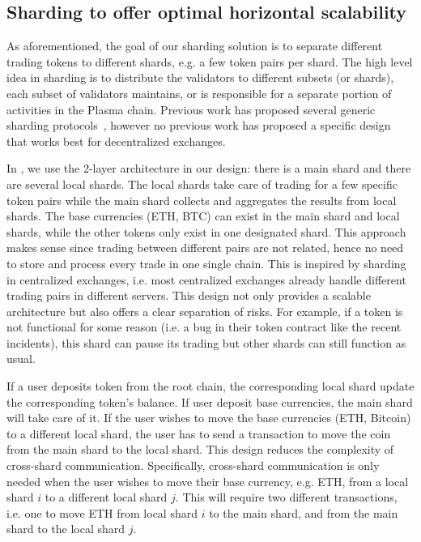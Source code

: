 \subsection{Sharding to offer optimal horizontal scalability}
As aforementioned, the goal of our sharding solution is to separate different trading tokens to different shards, e.g. a few token pairs per shard. The high level idea in sharding is to distribute the validators to different subsets (or shards), each subset of validators maintains, or is responsible for a separate portion of activities in the Plasma chain. Previous work has proposed several generic sharding protocols~\cite{elastico, omniledger, zilliqa}, however no previous work has proposed a specific design that works best for decentralized exchanges.

In \codename, we use the 2-layer architecture in our design: there is a main shard and there are several local shards. The local shards take care of trading for a few specific token pairs while the main shard collects and aggregates the results from local shards. The base currencies (ETH, BTC) can exist in the main shard and local shards, while the other tokens only exist in one designated shard. This approach makes sense since trading between different pairs are not related, hence no need to store and process every trade in one single chain. This is inspired by sharding in centralized exchanges, i.e. most centralized exchanges already handle different trading pairs in different servers. This design not only provides a scalable architecture but also offers a clear separation of risks. For example, if a token is not functional for some reason (i.e. a bug in their token contract like the recent incidents), this shard can pause its trading but other shards can still function as usual.

If a user deposits token from the root chain, the corresponding local shard update the corresponding token’s balance. If user deposit base currencies, the main shard will take care of it. If the user wishes to move the base currencies (ETH, Bitcoin) to a different local shard, the user has to send a transaction to move the coin  from the main shard to the local shard. This design reduces the complexity of cross-shard communication. Specifically, cross-shard communication is only needed when the user wishes to move their base currency, e.g. ETH, from a local shard $i$ to a different local shard $j$. This will require two different transactions, i.e. one to move ETH from local shard $i$ to the main shard, and from the main shard to the local shard $j$.

